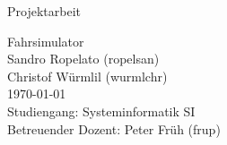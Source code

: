 %
%

\begin{titlepage}
\vspace{4em}
\center

\Large{\textsf{Projektarbeit}}
\vspace{1em}

\Huge{\textsf{Fahrsimulator}}
\vspace{2em}
\\
\Large{
	\textsf{
		Sandro Ropelato (ropelsan)\\
		Christof Würmlil (wurmlchr)\\
		\vspace{2em}
		\today\\
		\vspace{2em}
		Studiengang: Systeminformatik SI\\
		Betreuender Dozent: Peter Früh (frup)
	}
}

\end{titlepage}
